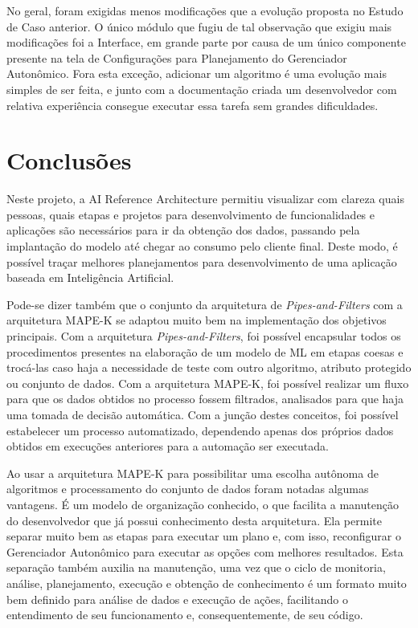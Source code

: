 \documentclass[portugues]{ic-tese}
\begin{document}
No geral, foram exigidas menos modificações que a evolução proposta no Estudo de Caso anterior. O único módulo que fugiu de tal observação que exigiu mais modificações foi a Interface, em grande parte por causa de um único componente presente na tela de Configurações para Planejamento do Gerenciador Autonômico. Fora esta exceção, adicionar um algoritmo é uma evolução mais simples de ser feita, e junto com a documentação criada um desenvolvedor com relativa experiência consegue executar essa tarefa sem grandes dificuldades.

\chapter{Conclusões}

Neste projeto, a AI Reference Architecture permitiu visualizar com clareza quais pessoas, quais etapas e projetos para desenvolvimento de funcionalidades e aplicações são necessários para ir da obtenção dos dados, passando pela implantação do modelo até chegar ao consumo pelo cliente final. Deste modo, é possível traçar melhores planejamentos para desenvolvimento de uma aplicação baseada em Inteligência Artificial. 

Pode-se dizer também que o conjunto da arquitetura de \textit{Pipes-and-Filters} com a arquitetura MAPE-K se adaptou muito bem na implementação dos objetivos principais. Com a arquitetura \textit{Pipes-and-Filters}, foi possível encapsular todos os procedimentos presentes na elaboração de um modelo de ML em etapas coesas e trocá-las caso haja a necessidade de teste com outro algoritmo, atributo protegido ou conjunto de dados. Com a arquitetura MAPE-K, foi possível realizar um fluxo para que os dados obtidos no processo fossem filtrados, analisados para que haja uma tomada de decisão automática. Com a junção destes conceitos, foi possível estabelecer um processo automatizado, dependendo apenas dos próprios dados obtidos em execuções anteriores para a automação ser executada.

Ao usar a arquitetura MAPE-K para possibilitar uma escolha autônoma de algoritmos e processamento do conjunto de dados foram notadas algumas vantagens. É um modelo de organização conhecido, o que facilita a manutenção do desenvolvedor que já possui conhecimento desta arquitetura. Ela permite separar muito bem as etapas para executar um plano e, com isso, reconfigurar o Gerenciador Autonômico para executar as opções com melhores resultados. Esta separação também auxilia na manutenção, uma vez que o ciclo de monitoria, análise, planejamento, execução e obtenção de conhecimento é um formato muito bem definido para análise de dados e execução de ações, facilitando o entendimento de seu funcionamento e, consequentemente, de seu código.
\end{document}

